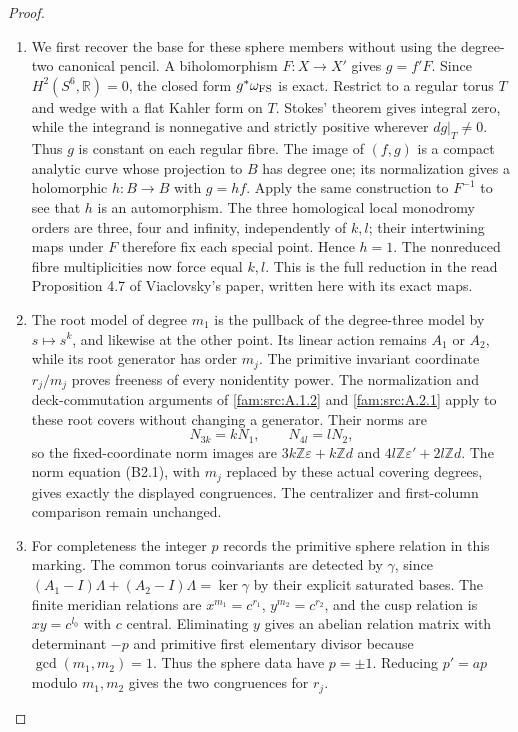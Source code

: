 \begin{proof}
\begin{enumerate}[label=\arabic*.,leftmargin=*]
\item We first recover the base for these sphere members without using the degree-two canonical pencil. A biholomorphism $F:X\to X'$ gives $g=f'F$. Since $H^2(S^6,\mathbb R)=0$, the closed form $g^*\omega_{\rm FS}$ is exact. Restrict to a regular torus $T$ and wedge with a flat Kahler form on $T$. Stokes' theorem gives integral zero, while the integrand is nonnegative and strictly positive wherever $dg|_T\ne0$. Thus $g$ is constant on each regular fibre. The image of $(f,g)$ is a compact analytic curve whose projection to $B$ has degree one; its normalization gives a holomorphic $h:B\to B$ with $g=hf$. Apply the same construction to $F^{-1}$ to see that $h$ is an automorphism. The three homological local monodromy orders are three, four and infinity, independently of $k,l$; their intertwining maps under $F$ therefore fix each special point. Hence $h=1$. The nonreduced fibre multiplicities now force equal $k,l$. This is the full reduction in the read Proposition 4.7 of Viaclovsky's paper, written here with its exact maps.

\item The root model of degree $m_1$ is the pullback of the degree-three model by $s\mapsto s^k$, and likewise at the other point. Its linear action remains $A_1$ or $A_2$, while its root generator has order $m_j$. The primitive invariant coordinate $r_j/m_j$ proves freeness of every nonidentity power. The normalization and deck-commutation arguments of \ref{fam:src:A.1.2} and \ref{fam:src:A.2.1} apply to these root covers without changing a generator. Their norms are
\[
 N_{3k}=kN_1,\qquad N_{4l}=lN_2,
\]
so the fixed-coordinate norm images are $3k\mathbb Z\varepsilon+k\mathbb Zd$ and $4l\mathbb Z\varepsilon'+2l\mathbb Zd$. The norm equation (B2.1), with $m_j$ replaced by these actual covering degrees, gives exactly the displayed congruences. The centralizer and first-column comparison remain unchanged.

\item For completeness the integer $p$ records the primitive sphere relation in this marking. The common torus coinvariants are detected by $\gamma$, since $(A_1-I)\Lambda+(A_2-I)\Lambda=\ker\gamma$ by their explicit saturated bases. The finite meridian relations are $x^{m_1}=c^{r_1}$, $y^{m_2}=c^{r_2}$, and the cusp relation is $xy=c^{l_0}$ with $c$ central. Eliminating $y$ gives an abelian relation matrix with determinant $-p$ and primitive first elementary divisor because $\gcd(m_1,m_2)=1$. Thus the sphere data have $p=\pm1$. Reducing $p'=ap$ modulo $m_1,m_2$ gives the two congruences for $r_j$.


\end{enumerate}
\end{proof}
